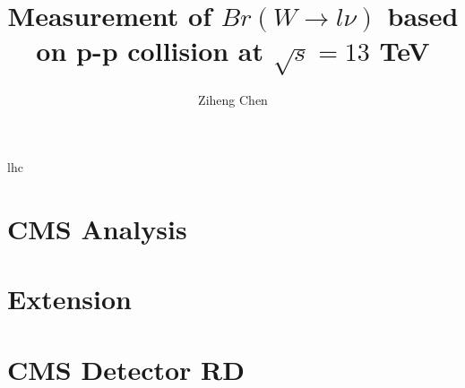 \documentclass[12pt]{nuthesis}
\author{Ziheng Chen}
\title{Measurement of $Br(W\to l \nu)$ based on p-p collision at $\sqrt{s}=13$ TeV}
\begin{document}
    

    
    \mainmatter  
    \acrfull{lhc}
    
    \part{CMS Analysis}    
    
    
    
    
    
    
    
    


    \part{Extension}
    
    


    \part{CMS Detector RD}
    
    


    
    

    \begin{singlespace}
    
    
    \end{singlespace}

    \appendix
    
    
    
    
    
    


    
\end{document}
